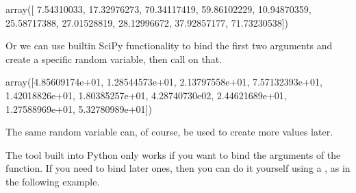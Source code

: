 \documentclass[letterpaper,10pt,english]{sphinxmanual}
\begin{document}
\begin{sphinxVerbatim}[commandchars=\\\{\}]
   
    
\end{sphinxVerbatim}

\begin{sphinxVerbatim}[commandchars=\\\{\}]
array([ 7.54310033, 17.32976273, 70.34117419, 59.86102229, 10.94870359,
       25.58717388, 27.01528819, 28.12996672, 37.92857177, 71.73230538])
\end{sphinxVerbatim}

Or we can use built\sphinxhyphen{}in SciPy functionality to bind the first two arguments and create a specific random variable, then call  on that.

\begin{sphinxVerbatim}[commandchars=\\\{\}]
       
               
\end{sphinxVerbatim}

\begin{sphinxVerbatim}[commandchars=\\\{\}]
array([4.85609174e+01, 1.28544573e+01, 2.13797558e+01, 7.57132393e+01,
       1.42018826e+01, 1.80385257e+01, 4.28740730e\PYGZhy{}02, 2.44621689e+01,
       1.27588969e+01, 5.32780989e+01])
\end{sphinxVerbatim}

The same random variable can, of course, be used to create more values later.

The  tool built into Python only works if you want to bind the  arguments of the function.  If you need to bind later ones, then you can do it yourself using a , as in the following example.

\begin{sphinxVerbatim}[commandchars=\\\{\}]
        
       

         

  
\end{sphinxVerbatim}
\end{document}
